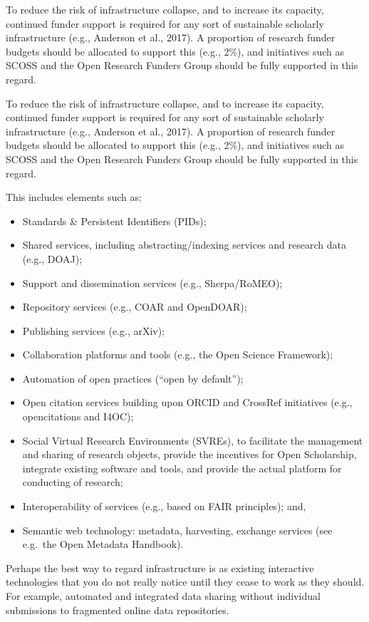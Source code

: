 \documentclass[]{article}
\begin{document}
To reduce the risk of infrastructure collapse, and to increase its
capacity, continued funder support is required for any sort of
sustainable scholarly infrastructure (e.g., Anderson et al., 2017). A
proportion of research funder budgets should be allocated to support
this (e.g., 2\%), and initiatives such as SCOSS and the Open Research
Funders Group should be fully supported in this regard.

To reduce the risk of infrastructure collapse, and to increase its
capacity, continued funder support is required for any sort of
sustainable scholarly infrastructure (e.g., Anderson et al., 2017). A
proportion of research funder budgets should be allocated to support
this (e.g., 2\%), and initiatives such as SCOSS and the Open Research
Funders Group should be fully supported in this regard.

This includes elements such as:

\begin{itemize}
\item
  Standards \& Persistent Identifiers (PIDs);
\item
  Shared services, including abstracting/indexing services and research
  data (e.g., DOAJ);
\item
  Support and dissemination services (e.g., Sherpa/RoMEO);
\item
  Repository services (e.g., COAR and OpenDOAR);
\item
  Publishing services (e.g., arXiv);
\item
  Collaboration platforms and tools (e.g., the Open Science Framework);
\item
  Automation of open practices (``open by default'');
\item
  Open citation services building upon ORCID and CrossRef initiatives
  (e.g., opencitations and I4OC);
\item
  Social Virtual Research Environments (SVREs), to facilitate the
  management and sharing of research objects, provide the incentives for
  Open Scholarship, integrate existing software and tools, and provide
  the actual platform for conducting of research;
\item
  Interoperability of services (e.g., based on FAIR principles); and,
\item
  Semantic web technology: metadata, harvesting, exchange services (see
  e.g.~the Open Metadata Handbook).
\end{itemize}

Perhaps the best way to regard infrastructure is as existing interactive
technologies that you do not really notice until they cease to work as
they should. For example, automated and integrated data sharing without
individual submissions to fragmented online data repositories.
\end{document}
